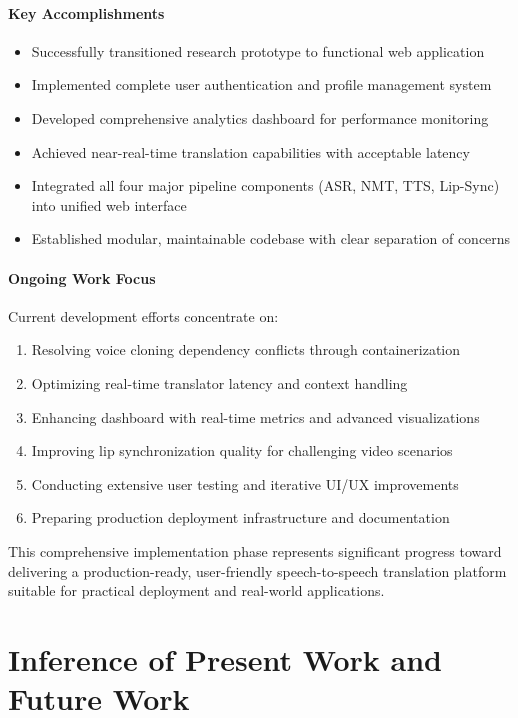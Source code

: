 \documentclass[12pt,oneside]{report}
\begin{document}
\subsubsection{Key Accomplishments}

\begin{itemize}
    \item Successfully transitioned research prototype to functional web application
    \item Implemented complete user authentication and profile management system
    \item Developed comprehensive analytics dashboard for performance monitoring
    \item Achieved near-real-time translation capabilities with acceptable latency
    \item Integrated all four major pipeline components (ASR, NMT, TTS, Lip-Sync) into unified web interface
    \item Established modular, maintainable codebase with clear separation of concerns
\end{itemize}

\subsubsection{Ongoing Work Focus}

Current development efforts concentrate on:
\begin{enumerate}
    \item Resolving voice cloning dependency conflicts through containerization
    \item Optimizing real-time translator latency and context handling
    \item Enhancing dashboard with real-time metrics and advanced visualizations
    \item Improving lip synchronization quality for challenging video scenarios
    \item Conducting extensive user testing and iterative UI/UX improvements
    \item Preparing production deployment infrastructure and documentation
\end{enumerate}

This comprehensive implementation phase represents significant progress toward delivering a production-ready, user-friendly speech-to-speech translation platform suitable for practical deployment and real-world applications.


\chapter{Inference of Present Work and Future Work}
\label{ch:conclusion}
\end{document}
